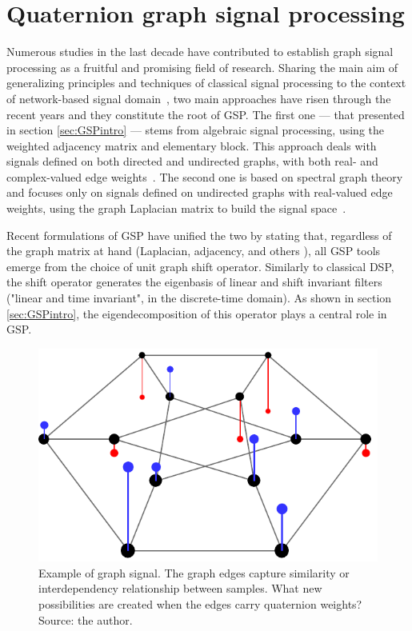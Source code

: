 \chapter{Quaternion graph signal processing}
\label{ch:QGSP}

Numerous studies in the last decade have contributed to establish graph signal processing as a fruitful and promising field of research. Sharing the main aim of generalizing principles and techniques of classical signal processing to the context of network-based signal domain~\cite{ortega2018graph}, two main approaches have risen through the recent years and they constitute the root of GSP. The first one --- that presented in section \ref{sec:GSPintro} --- stems from algebraic signal processing, using the weighted adjacency matrix and elementary block. This approach deals with signals defined on both directed and undirected graphs, with both real- and complex-valued edge weights~\cite{sandryhaila2014big}. The second one is based on spectral graph theory and focuses only on signals defined on undirected graphs with real-valued edge weights, using the graph Laplacian matrix to build the signal space~\cite{shuman2013emerging}.

Recent formulations of GSP have unified the two by stating that, regardless of the graph matrix at hand (Laplacian, adjacency, and others \cite{chen2018shift, dees2019unitary}), all GSP tools emerge from the choice of unit graph shift operator. Similarly to classical DSP, the shift operator generates the eigenbasis of linear and shift invariant filters ("linear and time invariant", in the discrete-time domain).
As shown in section \ref{sec:GSPintro}, the eigendecomposition of this operator plays a central role in GSP.

\begin{figure}
	\centering
	\includegraphics[width=0.3\linewidth]{Figures/signal_duher_graph_2.pdf}
	\caption{Example of graph signal. The graph edges capture similarity or interdependency relationship between samples. What new possibilities are created when the edges carry quaternion weights? Source: the author.}
	\label{fig:duher}
\end{figure}

